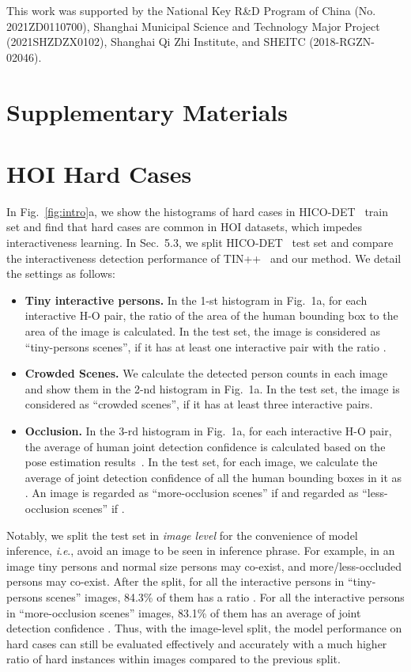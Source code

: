 \documentclass[runningheads]{llncs}
\newcommand{\ie}{\textit{i}.\textit{e}.}
\begin{document}
\vspace{0.3cm}
This work was supported by the National Key R\&D Program of China (No. 2021ZD0110700), Shanghai Municipal Science and Technology Major Project (2021SHZDZX0102), Shanghai Qi Zhi Institute, and SHEITC (2018-RGZN-02046).

\clearpage
\section*{Supplementary Materials}
\appendix
\section{HOI Hard Cases}
In Fig.~\ref{fig:intro}a, we show the histograms of hard cases in HICO-DET~\cite{hicodet} train set and find that hard cases are common in HOI datasets, which impedes interactiveness learning. 
In Sec.~5.3, we split HICO-DET~\cite{hicodet} test set and compare the interactiveness detection performance of TIN++~\cite{li2021transferable} and our method. 
We detail the settings as follows:
\begin{itemize}
    \item \textbf{Tiny interactive persons.} 
    In the 1-st histogram in Fig.~1a, for each interactive H-O pair, the ratio  of the area of the human bounding box to the area of the image is calculated. In the test set, the image is considered as ``tiny-persons scenes'', if it has at least one interactive pair with the ratio .
    \item \textbf{Crowded Scenes.}
    We calculate the detected person counts in each image and show them in the 2-nd histogram in Fig.~1a. In the test set, the image is considered as ``crowded scenes'', if it has at least three interactive pairs.
    \item \textbf{Occlusion.}
    In the 3-rd histogram in Fig.~1a, for each interactive H-O pair, the average of human joint detection confidence is calculated based on the pose estimation results~\cite{fang2017rmpe}. In the test set, for each image, we calculate the average of joint detection confidence of all the human bounding boxes in it as . An image is regarded as ``more-occlusion scenes'' if  and regarded as ``less-occlusion scenes'' if .
\end{itemize}

Notably, we split the test set in \textit{image level} for the convenience of model inference, 
\ie, avoid an image to be seen in 
inference phrase.
For example, in an image tiny persons and normal size persons may co-exist, and more/less-occluded persons may co-exist. 
After the split, 
for all the interactive persons in ``tiny-persons scenes'' images, 84.3\% of them has a ratio . 
For all the interactive persons in ``more-occlusion scenes'' images, 83.1\% of them has an average of joint detection confidence . 
Thus, with the image-level split, the model performance on hard cases can still be evaluated effectively and accurately with a much higher ratio of hard instances within images compared to the previous split.
\end{document}

